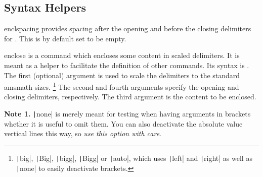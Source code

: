 \documentclass[english,a4paper,DIV=12,parskip=full,oneside]{scrartcl}
\begin{document}
    \subsection{Syntax Helpers}\label{subsec:syntax_helpers}

    \begin{commandlist}
        \item[enclspacing] provides spacing after the opening and before the closing delimiters for \codeCommand{\enclose}.
            This is by default set to be empty.
        \item[enclose] is a command which encloses some content in scaled delimiters.
            It is meant as a helper to facilitate the definition of other commands.
            Its syntax is .
            The first (optional) argument is used to scale the delimiters to the standard amsmath sizes.%
            \footnote{\texttt|big|, \texttt|Big|, \texttt|bigg|, \texttt|Bigg| or \texttt|auto|, which uses \texttt|left| and \texttt|right| as well as \texttt|none| to easily deactivate brackets.\label{footnote:amsmath_sizes}}
            The second and fourth arguments specify the opening and closing delimiters, respectively.
            The third argument is the content to be enclosed.
            \par\mathCodeExample{\enclose{[}{\dfrac{1}{2}}{]}} %
            \par\mathCodeExample{\enclose[Big][{\dfrac{1}{2}}]} %
            \par\mathCodeExample{\enclose[auto]{[}{\dfrac{1}{2}}{]}} %
            \par\mathCodeExample{\enclose[none]{[}{\dfrac{1}{2}}{]}} %

            \textbf{Note 1.} \texttt|none| is merely meant for testing when having arguments
            in brackets whether it is useful to omit them. You can also deactivate the absolute value
            vertical lines this way, so \emph{use this option with care}.


\end{commandlist}
\end{document}

